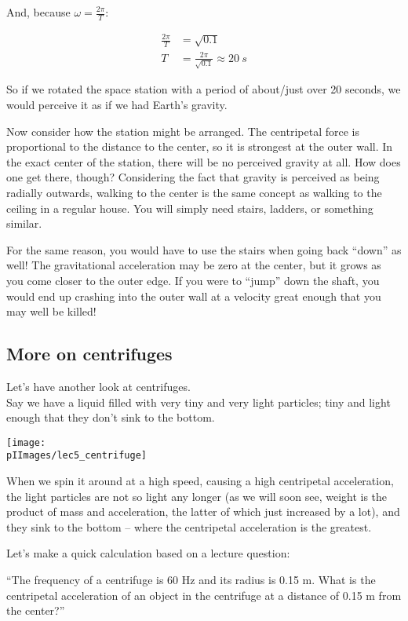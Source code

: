 And, because $\omega = \frac{2 \pi}{T}$:

\begin{align}
\frac{2 \pi}{T} &= \sqrt{0.1}\\
T &= \frac{2 \pi}{\sqrt{0.1}} \approx \SI{20}{s}
\end{align}

So if we rotated the space station with a period of about/just over 20 seconds, we would perceive it as if we had Earth's gravity.

Now consider how the station might be arranged. The centripetal force is proportional to the distance to the center, so it is strongest at the outer wall. In the exact center of the station, there will be no perceived gravity at all. How does one get there, though? Considering the fact that gravity is perceived as being radially outwards, walking to the center is the same concept as walking to the ceiling in a regular house. You will simply need stairs, ladders, or something similar.

For the same reason, you would have to use the stairs when going back ``down'' as well! The gravitational acceleration may be zero at the center, but it grows as you come closer to the outer edge. If you were to ``jump'' down the shaft, you would end up crashing into the outer wall at a velocity great enough that you may well be killed!

\subsection{More on centrifuges}

Let's have another look at centrifuges.\\
Say we have a liquid filled with very tiny and very light particles; tiny and light enough that they don't sink to the bottom.

\begin{center}
\texttt{[image: \\pIImages/lec5\_centrifuge]}
\end{center}

When we spin it around at a high speed, causing a high centripetal acceleration, the light particles are not so light any longer (as we will soon see, weight is the product of mass and acceleration, the latter of which just increased by a lot), and they sink to the bottom -- where the centripetal acceleration is the greatest.

Let's make a quick calculation based on a lecture question:

``The frequency of a centrifuge is 60 Hz and its radius is 0.15 m. What is the centripetal acceleration of an object in the centrifuge at a distance of 0.15 m from the center?''

